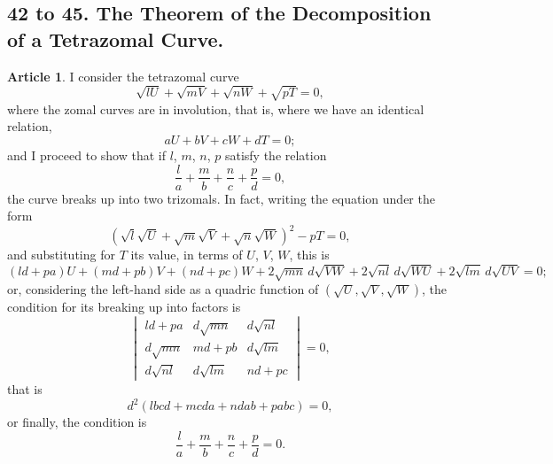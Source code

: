 \documentclass[11pt,a4paper]{article}
\theoremstyle{definition}
\newtheorem{art}{Article}
\begin{document}
\subsection*{42 to 45. The Theorem of the Decomposition of a Tetrazomal Curve.}

\begin{art}
I consider the tetrazomal curve
\[
\sqrt{lU} + \sqrt{mV} + \sqrt{nW} + \sqrt{pT} = 0,
\]
where the zomal curves are in involution, that is, where we have an identical relation,
\[
aU + bV + cW + dT = 0;
\]
and I proceed to show that if $l$, $m$, $n$, $p$ satisfy the relation
\[
\frac{l}{a} + \frac{m}{b} + \frac{n}{c} + \frac{p}{d} = 0,
\]
the curve breaks up into two trizomals. In fact, writing the equation under the form
\[
(\sqrt{l}\sqrt{U} + \sqrt{m}\sqrt{V} + \sqrt{n}\sqrt{W})^{2} - pT = 0,
\]
and substituting for $T$ its value, in terms of $U$, $V$, $W$, this is
\[
(ld + pa)U + (md + pb)V + (nd + pc)W + 2\sqrt{mn}\,d\sqrt{VW} + 2\sqrt{nl}\,d\sqrt{WU} + 2\sqrt{lm}\,d\sqrt{UV} = 0;
\]
or, considering the left-hand side as a quadric function of $(\sqrt{U}, \sqrt{V}, \sqrt{W})$, the condition for its breaking up into factors is
\[
\begin{vmatrix}
ld + pa & d\sqrt{mn} & d\sqrt{nl} \\
d\sqrt{mn} & md + pb & d\sqrt{lm} \\
d\sqrt{nl} & d\sqrt{lm} & nd + pc
\end{vmatrix} = 0,
\]
that is
\[
d^{2}(lbcd + mcda + ndab + pabc) = 0,
\]
or finally, the condition is
\[
\frac{l}{a} + \frac{m}{b} + \frac{n}{c} + \frac{p}{d} = 0.
\]
\end{art}
\end{document}
